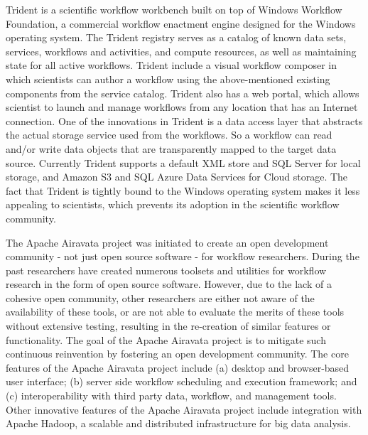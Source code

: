 Trident is a scientific workflow workbench built on top of Windows Workflow Foundation, a commercial workflow enactment engine designed for the Windows operating system. The Trident registry serves as a catalog of known data sets, services, workflows and activities, and compute resources, as well as maintaining state for all active workflows. Trident include a visual workflow composer in which scientists can author a workflow using the above-mentioned existing components from the service catalog. Trident also has a web portal, which allows scientist to launch and manage workflows from any location that has an Internet connection. One of the innovations in Trident is a data access layer that abstracts the actual storage service used from the workflows. So a workflow can read and/or write data objects that are transparently mapped to the target data source. Currently Trident supports a default XML store and SQL Server for local storage, and Amazon S3 and SQL Azure Data Services for Cloud storage. The fact that Trident is tightly bound to the Windows operating system makes it less appealing to scientists, which prevents its adoption in the scientific workflow community.

The Apache Airavata project was initiated to create an open development community - not just open source software - for workflow researchers. During the past researchers have created numerous toolsets and utilities for workflow research in the form of open source software. However, due to the lack of a cohesive open community, other researchers are either not aware of the availability of these tools, or are not able to evaluate the merits of these tools without extensive testing, resulting in the re-creation of similar features or functionality. The goal of the Apache Airavata project is to mitigate such continuous reinvention by fostering an open development community. The core features of the Apache Airavata project include (a) desktop and browser-based user interface; (b) server side workflow scheduling and execution framework; and (c) interoperability with third party data, workflow, and management tools. Other innovative features of the Apache Airavata project include integration with Apache Hadoop, a scalable and distributed infrastructure for big data analysis.


